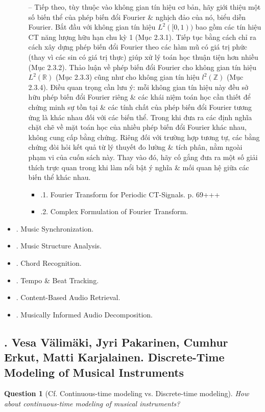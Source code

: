 \documentclass{article}
\newtheorem{question}{Question}
\begin{document}
\begin{itemize}
\begin{itemize}
		-- Tiếp theo, tùy thuộc vào không gian tín hiệu cơ bản, hãy giới thiệu một số biến thể của phép biến đổi Fourier \& nghịch đảo của nó, biểu diễn Fourier. Bắt đầu với không gian tín hiệu $L^2([0,1))$ bao gồm các tín hiệu CT năng lượng hữu hạn chu kỳ 1 (Mục 2.3.1). Tiếp tục bằng cách chỉ ra cách xây dựng phép biến đổi Fourier theo các hàm mũ có giá trị phức (thay vì các sin có giá trị thực) giúp xử lý toán học thuận tiện hơn nhiều (Mục 2.3.2). Thảo luận về phép biến đổi Fourier cho không gian tín hiệu $L^2(\mathbb{R})$ (Mục 2.3.3) cũng như cho không gian tín hiệu $l^2(\mathbb{Z})$ (Mục 2.3.4). Điều quan trọng cần lưu ý: mỗi không gian tín hiệu này đều sở hữu phép biến đổi Fourier riêng \& các khái niệm toán học cần thiết để chứng minh sự tồn tại \& các tính chất của phép biến đổi Fourier tương ứng là khác nhau đối với các biến thể. Trong khi đưa ra các định nghĩa chặt chẽ về mặt toán học của nhiều phép biến đổi Fourier khác nhau, không cung cấp bằng chứng. Riêng đối với trường hợp tương tự, các bằng chứng đòi hỏi kết quả từ lý thuyết đo lường \& tích phân, nằm ngoài phạm vi của cuốn sách này. Thay vào đó, hãy cố gắng đưa ra một số giải thích trực quan trong khi làm nổi bật ý nghĩa \& mối quan hệ giữa các biến thể khác nhau.
		\begin{itemize}
			\item {.1. Fourier Transform for Periodic CT-Signals.} p. 69+++
			\item {.2. Complex Formulation of Fourier Transform.}
		\end{itemize}
	\end{itemize}
	\item {. Music Synchronization.}
	\item {. Music Structure Analysis.}
	\item {. Chord Recognition.}
	\item {. Tempo \& Beat Tracking.}
	\item {. Content-Based Audio Retrieval.}
	\item {. Musically Informed Audio Decomposition.} 
\end{itemize}


\subsection{\cite{Valimaki_Pakarinen_Erkut_Karjalainen2006}. {\sc Vesa Välimäki, Jyri Pakarinen, Cumhur Erkut, Matti Karjalainen}. Discrete-Time Modeling of Musical Instruments}
{\sf[283 citations]}
\begin{question}[Cf. Continuous-time modeling vs. Discrete-time modeling]
	How about continuous-time modeling of musical instruments?
\end{question}
\end{document}
